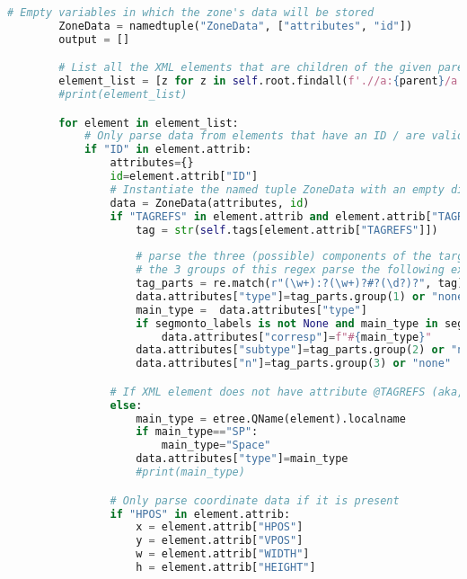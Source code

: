 \documentclass[class=article, crop=false]{standalone}
\begin{document}
\begin{lstlisting}[language=python, style=python]
        # Empty variables in which the zone's data will be stored
        ZoneData = namedtuple("ZoneData", ["attributes", "id"])
        output = []

        # List all the XML elements that are children of the given parent
        element_list = [z for z in self.root.findall(f'.//a:{parent}/a:{target}', namespaces=NS)]
        #print(element_list)

        for element in element_list:
            # Only parse data from elements that have an ID / are valid
            if "ID" in element.attrib:
                attributes={}
                id=element.attrib["ID"]
                # Instantiate the named tuple ZoneData with an empty dictionary and the element's ID if it was found
                data = ZoneData(attributes, id)
                if "TAGREFS" in element.attrib and element.attrib["TAGREFS"] in self.tags:
                    tag = str(self.tags[element.attrib["TAGREFS"]])
                    
                    # parse the three (possible) components of the targeted ALTO element's @TAGREFS, according to SegmOnto guidelines;
                    # the 3 groups of this regex parse the following expected tag syntax: MainZone:column#1 --> (MainZone)(column)(1)
                    tag_parts = re.match(r"(\w+):?(\w+)?#?(\d?)?", tag)
                    data.attributes["type"]=tag_parts.group(1) or "none"
                    main_type =  data.attributes["type"]
                    if segmonto_labels is not None and main_type in segmonto_labels:
                        data.attributes["corresp"]=f"#{main_type}"
                    data.attributes["subtype"]=tag_parts.group(2) or "none"
                    data.attributes["n"]=tag_parts.group(3) or "none"

                # If XML element does not have attribute @TAGREFS (aka, is a segment/space/glyph), assign it a type
                else:
                    main_type = etree.QName(element).localname
                    if main_type=="SP":
                        main_type="Space"
                    data.attributes["type"]=main_type
                    #print(main_type)

                # Only parse coordinate data if it is present
                if "HPOS" in element.attrib:
                    x = element.attrib["HPOS"]
                    y = element.attrib["VPOS"]
                    w = element.attrib["WIDTH"]
                    h = element.attrib["HEIGHT"]


\end{lstlisting}
\end{document}
